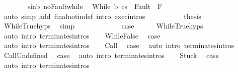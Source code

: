 \begin{isabellebody}
\ \ \ \ \ \ \isamarkupfalse%
\ s{\isacharunderscore}in{\isacharunderscore}b\ noFault{\isacharunderscore}while\ \isamarkupfalse%
\ {\isachardoublequoteopen}{\isasymGamma}{\isasymturnstile}{\isasymlangle}While\ b\ c{\isacharcomma}s{\isacharprime}\ {\isasymrangle}\ {\isasymRightarrow}{\isasymnotin}Fault\ {\isacharbackquote}\ F{\isachardoublequoteclose}\isanewline
\ \ \ \ \ \ \ \ \isamarkupfalse%
\ {\isacharparenleft}auto\ simp\ add{\isacharcolon}\ final{\isacharunderscore}notin{\isacharunderscore}def\ intro{\isacharcolon}\ exec{\isachardot}intros{\isacharparenright}\isanewline
\ \ \ \ \ \ \isamarkupfalse%
\ {\isacharasterisk}\ \isamarkupfalse%
\ {\isacharquery}thesis\isanewline
\ \ \ \ \ \ \ \ \isamarkupfalse%
\ WhileTrue{\isachardot}hyps\ \isamarkupfalse%
\ simp\isanewline
\ \ \ \ \isamarkupfalse%
\isanewline
\ \ \isacommand{{\isacharbraceright}}\isamarkupfalse%
\isanewline
\ \ \isamarkupfalse%
\ \isamarkupfalse%
\ {\isacharquery}case\isanewline
\ \ \ \ \isamarkupfalse%
\ WhileTrue{\isachardot}hyps\ \isamarkupfalse%
\ {\isacharparenleft}auto\ intro{\isacharcolon}\ terminates{\isachardot}intros{\isacharparenright}\isanewline
{}\isamarkupfalse%
\isanewline
\ \ \isamarkupfalse%
\ WhileFalse\ \isamarkupfalse%
\ {\isacharquery}case\ \isamarkupfalse%
\ {\isacharparenleft}auto\ intro{\isacharcolon}\ terminates{\isachardot}intros{\isacharparenright}\isanewline
{}\isamarkupfalse%
\isanewline
\ \ \isamarkupfalse%
\ Call\ \isamarkupfalse%
\ {\isacharquery}case\ \isamarkupfalse%
\ {\isacharparenleft}auto\ intro{\isacharcolon}\ terminates{\isachardot}intros{\isacharparenright}\isanewline
{}\isamarkupfalse%
\isanewline
\ \ \isamarkupfalse%
\ CallUndefined\ \isamarkupfalse%
\ {\isacharquery}case\ \isamarkupfalse%
\ {\isacharparenleft}auto\ intro{\isacharcolon}\ terminates{\isachardot}intros{\isacharparenright}\isanewline
{}\isamarkupfalse%
\isanewline
\ \ \isamarkupfalse%
\ Stuck\ \isamarkupfalse%
\ {\isacharquery}case\ \isamarkupfalse%
\ {\isacharparenleft}auto\ intro{\isacharcolon}\ terminates{\isachardot}intros{\isacharparenright}\isanewline
{}\isamarkupfalse%
\isanewline
\ \ \isamarkupfalse%

\end{isabellebody}
